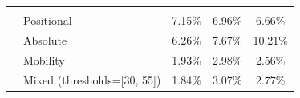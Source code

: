 \begin{table}[H]
{\begin{tabular}{
            @{}
            >{\raggedright\arraybackslash}p{1cm}
            >{\raggedright\arraybackslash}p{4cm}
            S
            S
            S
            @{}
            }
            \midrule
                                                                                                   \\
            \cmidrule(lr){1-5}
                           & Positional                  & 7.15\%                 & 6.96\%                   & 6.66\%                  \\
                           & Absolute                    & 6.26\%                 & 7.67\%                   & 10.21\%                 \\
                           & Mobility                    & 1.93\%                 & 2.98\%                   & 2.56\%                  \\
                           & Mixed (thresholds=[30, 55]) & 1.84\%                 & 3.07\%                   & 2.77\%                  \\
            \bottomrule
        \end{tabular}
    }
    \label{tab:node_explored_summary}
\end{table}

